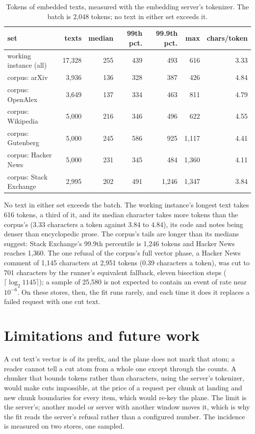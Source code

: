 \documentclass[11pt]{article}
\theoremstyle{plain}
\theoremstyle{remark}
\begin{document}
\begin{table}[t]
\centering
\caption{Tokens of embedded texts, measured with the embedding server's tokenizer. The batch is
2{,}048 tokens; no text in either set exceeds it.}\label{tab:incidence}
\begin{tabular}{lrrrrrr}
\toprule
set & texts & median & 99th pct. & 99.9th pct. & max & chars/token \\
\midrule
working instance (all) & 17{,}328 & 255 & 439 & 493 & 616 & 3.33 \\
corpus: arXiv & 3{,}936 & 136 & 328 & 387 & 426 & 4.84 \\
corpus: OpenAlex & 3{,}649 & 137 & 334 & 463 & 811 & 4.79 \\
corpus: Wikipedia & 5{,}000 & 216 & 346 & 496 & 622 & 4.55 \\
corpus: Gutenberg & 5{,}000 & 245 & 586 & 925 & 1{,}117 & 4.41 \\
corpus: Hacker News & 5{,}000 & 231 & 345 & 484 & 1{,}360 & 4.11 \\
corpus: Stack Exchange & 2{,}995 & 202 & 491 & 1{,}246 & 1{,}347 & 3.84 \\
\bottomrule
\end{tabular}
\end{table}

No text in either set exceeds the batch. The working instance's longest text takes 616 tokens, a
third of it, and its median character takes more tokens than the corpus's (3.33 characters a token
against 3.84 to 4.84), its code and notes being denser than encyclopedic prose. The corpus's tails
are longer than its medians suggest: Stack Exchange's 99.9th percentile is 1{,}246 tokens and
Hacker News reaches 1{,}360. The one refusal of the corpus's full vector phase, a Hacker News
comment of 1{,}145 characters at 2{,}951 tokens (0.39 characters a token), was cut to 701 characters
by the runner's equivalent fallback, eleven bisection steps ($\lceil\log_2 1145\rceil$); a sample of
25{,}580 is not expected to contain an event of rate near $10^{-6}$. On these stores, then, the fit
runs rarely, and each time it does it replaces a failed request with one cut text.

\section{Limitations and future work}

A cut text's vector is of its prefix, and the plane does not mark that atom; a reader cannot tell a
cut atom from a whole one except through the counts. A chunker that bounds tokens rather than
characters, using the server's tokenizer, would make cuts impossible, at the price of a request
per chunk at landing and new chunk boundaries for every item, which would re-key the plane. The
limit is the server's; another model or server with another window moves it, which is why the fit
reads the server's refusal rather than a configured number. The incidence is measured on two
stores, one sampled.
\end{document}
